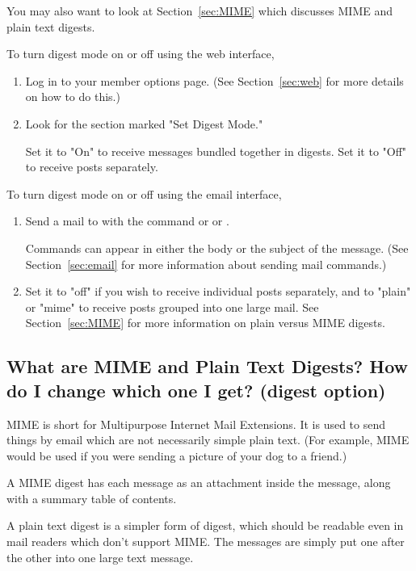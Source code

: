 \documentclass{howto}
\begin{document}
You may also want to look at Section~\ref{sec:MIME} which discusses MIME
and plain text digests.

To turn digest mode on or off using the web interface,
\begin{enumerate}
	\item Log in to your member options page.  (See Section~\ref{sec:web} 
	for more details on how to do this.)
	\item Look for the section marked "Set Digest Mode."  

	Set it to "On" to 
	receive messages bundled together in digests.  Set it to "Off" to 
	receive posts separately.
\end{enumerate}

To turn digest mode on or off using the email interface,
\begin{enumerate} 
   \item Send a mail to  with the command
    or  or .
   
   Commands can appear
   in either the body or the subject of the message.  (See
   Section~\ref{sec:email} for more information about sending mail
   commands.)
   \item Set it to "off" if you wish to receive individual posts separately,
	and to "plain" or "mime" to receive posts grouped into one large mail.
	See Section~\ref{sec:MIME} for more information on plain versus MIME
	digests.
\end{enumerate}


\subsection{What are MIME and Plain Text Digests?  How do I change which one
I get? (digest option)\label{sec:MIME}}

MIME is short for Multipurpose Internet Mail Extensions.  It is used to 
send things by email which are not necessarily simple plain text.  (For 
example, MIME would be used if you were sending a picture of your dog to 
a friend.)  

A MIME digest has each message as an attachment inside the message, along
with a summary table of contents.  

A plain text digest is a simpler form of digest, which should be readable 
even in mail readers which don't support MIME.  The messages are simply put 
one after the other into one large text message.
\end{document}
